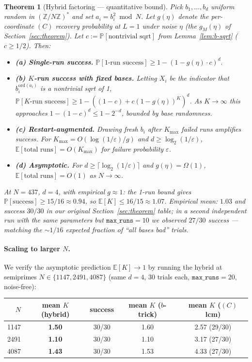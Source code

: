 \documentclass[11pt]{article}
\newtheorem{theorem}{Theorem}
\begin{document}
\begin{theorem}[Hybrid factoring --- quantitative bound]\label{thm:hybrid-formal}
Pick $b_1, \ldots, b_d$ uniform random in $(\mathbb{Z}/N\mathbb{Z})^*$ and set $a_i = b_i^2 \bmod N$. Let $g(\eta)$ denote the per-coordinate $(C)$ recovery probability at $L = 1$ under noise $\eta$ (the $g_M(\eta)$ of Section~\ref{sec:theorem}). Let $c := \mathbb{P}[\text{nontrivial sqrt}]$ from Lemma~\ref{lem:b-sqrt} ($c \geq 1/2$). Then:
\begin{itemize}
  \item \textbf{(a) Single-run success.} $\mathbb{P}[\text{1-run success}] \geq 1 - (1 - g(\eta) \cdot c)^d.$
  \item \textbf{(b) $K$-run success with fixed bases.} Letting $X_i$ be the indicator that $b_i^{\mathrm{ord}(a_i)}$ is a nontrivial sqrt of 1, $\mathbb{P}[K\text{-run success}] \geq 1 - ((1 - c) + c(1 - g(\eta))^K)^d$. As $K \to \infty$ this approaches $1 - (1 - c)^d \leq 1 - 2^{-d}$, \emph{bounded by base randomness}.
  \item \textbf{(c) Restart-augmented.} Drawing fresh $b_i$ after $K_{\max}$ failed runs amplifies success. For $K_{\max} = O(\log(1/\varepsilon)/g)$ and $d \geq \log_2(1/\varepsilon)$, $\mathbb{E}[\text{total runs}] = O(K_{\max})$ for failure probability $\varepsilon$.
  \item \textbf{(d) Asymptotic.} For $d \geq \lceil \log_2 (1/\varepsilon) \rceil$ and $g(\eta) = \Omega(1)$, $\mathbb{E}[\text{total runs}] = O(1)$ as $N \to \infty$.
\end{itemize}
At $N = 437$, $d = 4$, with empirical $g \approx 1$: the 1-run bound gives $\mathbb{P}[\text{success}] \geq 15/16 \approx 0.94$, so $\mathbb{E}[K] \leq 16/15 \approx 1.07$. Empirical mean: $1.03$ and success $30/30$ in our original Section~\ref{sec:theorem} table; in a second independent run with the same parameters but $\mathtt{max\_runs} = 10$ we observed $27/30$ success --- matching the $\sim 1/16$ expected fraction of ``all bases bad'' trials.
\end{theorem}

\paragraph{Scaling to larger $N$.} We verify the asymptotic prediction $\mathbb{E}[K] \to 1$ by running the hybrid at semiprimes $N \in \{1147, 2491, 4087\}$ (same $d = 4$, 30 trials each, $\mathtt{max\_runs} = 20$, noise-free):

\begin{center}
\begin{tabular}{rcccc}
\toprule
$N$ & mean $K$ (hybrid) & success & mean $K$ ($b$-trick) & mean $K$ ($(C)$ lcm) \\
\midrule
1147 & \textbf{1.50} & 30/30 & 1.60 & 2.57 (29/30) \\
2491 & \textbf{1.10} & 30/30 & 1.10 & 3.17 (27/30) \\
4087 & \textbf{1.43} & 30/30 & 1.53 & 4.33 (27/30) \\
\bottomrule
\end{tabular}
\end{center}
\end{document}
